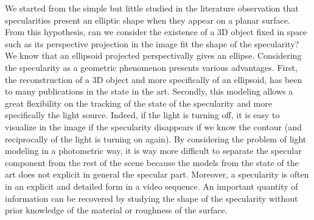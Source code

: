 
We started from the simple but little studied in the literature observation that specularities present an elliptic shape when they appear on a planar surface. From this hypothesis, can we consider the existence of a 3D object fixed in space such as its perspective projection in the image fit the shape of the specularity? We know that an ellipsoid projected perspectivally gives an ellipse. Considering the specularity as a geometric phenomenon presents various advantages. First, the reconstruction of a 3D object and more specifically of an ellipsoid, has been to many publications in the state in the art.
Secondly, this modeling allows a great flexibility on the tracking of the state of the specularity and more specifically the light source. Indeed, if the light is turning off, it is easy to visualize in the image if the specularity disappears if we know the contour (and reciprocally of the light is turning on again). By considering the problem of light modeling in a photometric way, it is way more difficult to separate the specular component from the rest of the scene because the models from the state of the art does not explicit in general the specular part. Moreover, a specularity is often in an explicit and detailed form in a video sequence. An important quantity of information can be recovered by studying the shape of the specularity without prior knowledge of the material or roughness of the surface.

